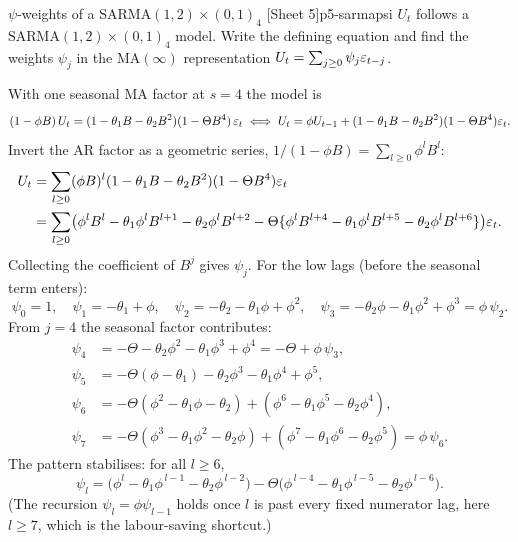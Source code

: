 \begin{exercise}{$\psi$-weights of a SARMA$(1,2)\times(0,1)_4$ \quad\textnormal{[Sheet 5]}}{p5-sarmapsi}
$U_t$ follows a $\mathrm{SARMA}(1,2)\times(0,1)_4$ model. Write the defining
equation and find the weights $\psi_j$ in the MA$(\infty)$ representation
$U_t=\sum_{j\ge0}\psi_j\varepsilon_{t-j}$.
\end{exercise}
\begin{solution}
With one seasonal MA factor at $s=4$ the model is
\[
(1-\phi B)\,U_t=(1-\theta_1B-\theta_2B^{2})(1-\Theta B^{4})\,\varepsilon_t
\;\Longleftrightarrow\;
U_t=\phi U_{t-1}+(1-\theta_1B-\theta_2B^{2})(1-\Theta B^{4})\varepsilon_t .
\]
Invert the AR factor as a geometric series, $1/(1-\phi B)=\sum_{l\ge0}\phi^{l}B^{l}$:
\[
\begin{aligned}
U_t&=\sum_{l\ge0}(\phi B)^{l}(1-\theta_1B-\theta_2B^{2})(1-\Theta B^{4})\varepsilon_t\\
&=\sum_{l\ge0}\bigl(\phi^{l}B^{l}-\theta_1\phi^{l}B^{l+1}-\theta_2\phi^{l}B^{l+2}
-\Theta\{\phi^{l}B^{l+4}-\theta_1\phi^{l}B^{l+5}-\theta_2\phi^{l}B^{l+6}\}\bigr)\varepsilon_t .
\end{aligned}
\]
Collecting the coefficient of $B^{j}$ gives $\psi_j$. For the low lags
(before the seasonal term enters):
\[
\psi_0=1,\quad
\psi_1=-\theta_1+\phi,\quad
\psi_2=-\theta_2-\theta_1\phi+\phi^{2},\quad
\psi_3=-\theta_2\phi-\theta_1\phi^{2}+\phi^{3}=\phi\,\psi_2 .
\]
From $j=4$ the seasonal factor contributes:
\[
\begin{aligned}
\psi_4&=-\Theta-\theta_2\phi^{2}-\theta_1\phi^{3}+\phi^{4}=-\Theta+\phi\,\psi_3,\\
\psi_5&=-\Theta(\phi-\theta_1)-\theta_2\phi^{3}-\theta_1\phi^{4}+\phi^{5},\\
\psi_6&=-\Theta(\phi^{2}-\theta_1\phi-\theta_2)+(\phi^{6}-\theta_1\phi^{5}-\theta_2\phi^{4}),\\
\psi_7&=-\Theta(\phi^{3}-\theta_1\phi^{2}-\theta_2\phi)+(\phi^{7}-\theta_1\phi^{6}-\theta_2\phi^{5})=\phi\,\psi_6 .
\end{aligned}
\]
The pattern stabilises: for all $l\ge6$,
\[
\boxed{\;\psi_l=\bigl(\phi^{l}-\theta_1\phi^{\,l-1}-\theta_2\phi^{\,l-2}\bigr)
-\Theta\bigl(\phi^{\,l-4}-\theta_1\phi^{\,l-5}-\theta_2\phi^{\,l-6}\bigr).\;}
\]
(The recursion $\psi_l=\phi\psi_{l-1}$ holds once $l$ is past every fixed
numerator lag, here $l\ge7$, which is the labour-saving shortcut.)
\end{solution}

